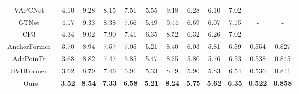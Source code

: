 \begin{table*}[t]
\begin{tabular}{|c|cccccccc|ccc|}
            
              VAPCNet~\citep{fu2023vapcnet}  & 4.10 & 9.28 & 8.15 & 7.51 & 5.55 & 9.18 & 6.28 & 6.10 & 7.02 & - & - \\
              GTNet~\citep{DBLP:journals/ijcv/ZhangLXNZTL23}  & 4.17 & 9.33 & 8.38 & 7.66 & 5.49 & 9.44 & 6.69 & 6.07 & 7.15 & - & - \\
              CP3~\citep{10097548}  & 4.34 & 9.02 & 7.90 & 7.41 & 6.35 & 8.52 & 6.32 & 6.26 & 7.02 & - & - \\
              AnchorFormer~\citep{chen2023anchorformer}  & 3.70 & 8.94 & 7.57 & 7.05 & 5.21 & 8.40 & 6.03 & 5.81 & 6.59 & 0.554 & 0.827 \\
              AdaPoinTr~\citep{10232862}  & 3.68 & 8.82 & 7.47 & 6.85 & 5.47 & 8.35 & 5.80 & 5.76 & 6.53 & 0.538 & 0.845 \\
              SVDFormer~\citep{Zhu_2023_ICCV} & 3.62 & 8.79 & 7.46 & 6.91 & 5.33 & 8.49 & 5.90 & 5.83& 6.54 & 0.536 & 0.841 \\

              \hline
              Ours & \textbf{3.52} & \textbf{8.54} & \textbf{7.33} & \textbf{6.58} & \textbf{5.21} & \textbf{8.24} & \textbf{5.75} & \textbf{5.62}& \textbf{6.35} & \textbf{0.522} &\textbf{0.858} \\
              \hline
    \end{tabular}
\end{table*}


